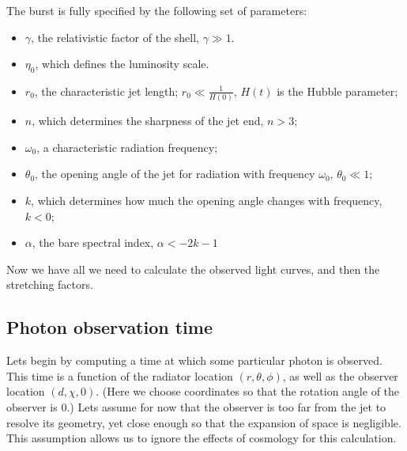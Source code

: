 \documentclass{article}
\begin{document}
The burst is fully specified by the following set of parameters:
\begin{itemize}
\item{$\gamma$, the relativistic factor of the shell, $\gamma \gg 1$.}
\item{$\eta_0$, which defines the luminosity scale.}
\item{$r_0$, the characteristic jet length; $r_0 \ll \frac{1}{H\left(0\right)}$, $H\left(t\right)$ is the Hubble parameter;}
\item{$n$, which determines the sharpness of the jet end, $n > 3$;}
\item{$\omega_0$, a characteristic radiation frequency;}
\item{$\theta_0$, the opening angle of the jet for radiation with frequency $\omega_0$, $\theta_0 \ll 1$;}
\item{$k$, which determines how much the opening angle changes with frequency, $k < 0$;}
\item{$\alpha$, the bare spectral index, $\alpha < -2k - 1$}
\end{itemize}

Now we have all we need to calculate the observed light curves, and then the stretching factors.

\subsection{Photon observation time}

Lets begin by computing a time at which some particular photon is observed. This time is a function of the radiator location $\left(r, \theta, \phi\right)$, as well as the observer location $\left(d, \chi, 0\right)$. (Here we choose coordinates so that the rotation angle of the observer is $0$.) Lets assume for now that the observer is too far from the jet to resolve its geometry, yet close enough so that the expansion of space is negligible. This assumption allows us to ignore the effects of cosmology for this calculation.
\end{document}
